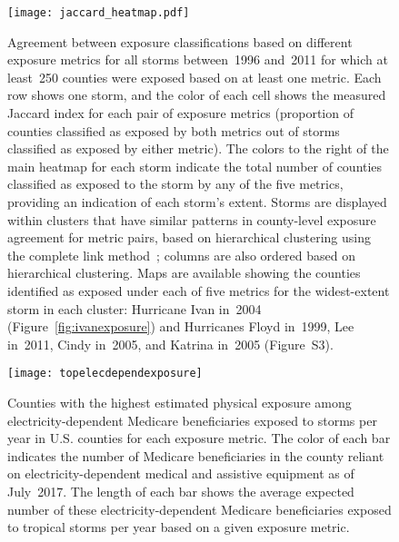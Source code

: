 \begin{figure}%
\centering 
\texttt{[image: jaccard\_heatmap.pdf]} 
\caption{Agreement between exposure classifications based on different
         exposure metrics for all storms between~1996 and~2011 for which 
	 at least~250 counties were exposed based on at least one metric.
	 Each row shows one storm, and the color of each cell shows the 
	 measured Jaccard index for each pair of exposure metrics 
	 (proportion of counties classified as exposed by both metrics out 
	 of storms classified as exposed by either metric). The colors to the 
	 right of the main heatmap for each storm indicate the total number of 
	 counties classified as exposed to the storm by any of the five metrics, 
	 providing an indication of each storm's extent. Storms are displayed 
	 within clusters that have similar patterns in county-level exposure 
	 agreement for metric pairs, based on hierarchical clustering using the 
	 complete link method~\parencite{murtagh2012algorithms}; columns are also 
	 ordered based on hierarchical clustering. Maps are available showing the 
	 counties identified as exposed under each of five metrics for the widest-extent 
	 storm in each cluster: Hurricane Ivan in~2004 (Figure~\ref{fig:ivanexposure}) 
	 and Hurricanes Floyd in~1999, Lee in~2011, Cindy in~2005, and Katrina 
	 in~2005 (Figure~S3).
} 
\label{fig:jaccard}
\end{figure}

\clearpage

\begin{figure*}%
\centering
\texttt{[image: topelecdependexposure]}
\caption{Counties with the highest estimated physical exposure among
electricity-dependent Medicare beneficiaries exposed to storms per year in U.S.
counties for each exposure metric. The color of each bar indicates the number
of Medicare beneficiaries in the county reliant on electricity-dependent
medical and assistive equipment as of July~2017. The length
of each bar shows the average expected number of these electricity-dependent
Medicare beneficiaries exposed to tropical storms per year based on a given
exposure metric.}
\label{fig:topelecdependexposure}
\end{figure*}


